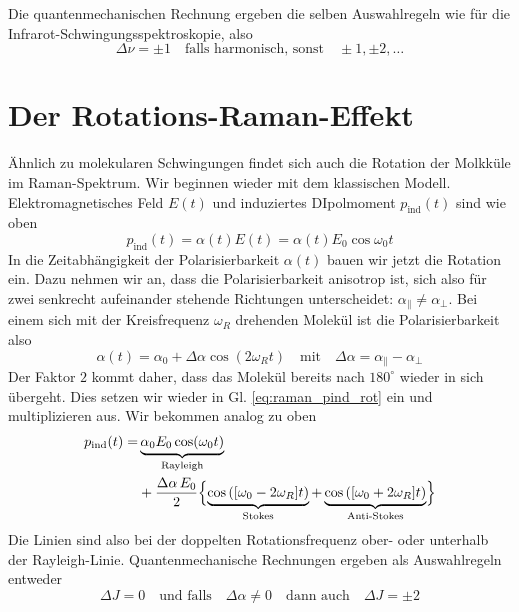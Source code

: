 Die quantenmechanischen Rechnung ergeben die selben Auswahlregeln wie für die Infrarot-Schwingungsspektroskopie, also 
\begin{equation}
 \Delta \nu = \pm 1 \quad \text{falls harmonisch, sonst} \quad \pm 1, \pm 2, \dots  
\end{equation}



\section{Der Rotations-Raman-Effekt}

Ähnlich zu molekularen Schwingungen findet sich auch die Rotation der Molkküle im Raman-Spektrum. Wir beginnen wieder mit dem klassischen Modell. Elektromagnetisches Feld $E(t)$ und induziertes DIpolmoment $p_\text{ind}(t)$ sind wie oben
\begin{equation}
p_\text{ind}(t) = \alpha(t) E(t) = \alpha(t) E_0 \cos \omega_0 t \label{eq:raman_pind_rot}
\end{equation}
In die Zeitabhängigkeit der Polarisierbarkeit $\alpha(t)$ bauen wir jetzt die Rotation ein. Dazu nehmen wir an, dass die Polarisierbarkeit anisotrop ist, sich also für zwei senkrecht aufeinander stehende Richtungen unterscheidet: $\alpha_\parallel \neq \alpha_\perp$. Bei einem sich mit der Kreisfrequenz $\omega_R$ drehenden Molekül ist die Polarisierbarkeit also
\begin{equation}
\alpha(t) = \alpha_0 + \Delta \alpha \cos ( 2 \omega_R t) \quad \text{mit} \quad \Delta \alpha = \alpha_\parallel - \alpha_\perp
\end{equation}
Der Faktor $2$ kommt daher, dass das Molekül bereits nach $180^\circ$ wieder in sich übergeht. Dies setzen wir wieder in Gl. \ref{eq:raman_pind_rot} ein und multiplizieren aus. Wir bekommen analog zu oben
\begin{align}
p_\text{ind}(t) = & \underbrace{  \alpha_0 E_0 \cos(\omega_0 t) }_\text{Rayleigh} \\
& +   \frac{ \Delta \alpha \,  E_0 }{2} 
\Bigl\{ 
\underbrace{ \cos \left( [\omega_0 -2 \omega_R] t \right)}_\text{Stokes}  +  \underbrace{\cos \left( [\omega_0 + 2 \omega_R] t \right)  
}_\text{Anti-Stokes} 
\Bigr\} 
\nonumber
\end{align}
Die Linien sind also bei der doppelten Rotationsfrequenz ober- oder unterhalb der Rayleigh-Linie. Quantenmechanische Rechnungen ergeben als Auswahlregeln entweder
\begin{equation}
\Delta J = 0 \quad \text{und falls} \quad  \Delta \alpha \neq 0 \quad  \text{dann auch} \quad \Delta J = \pm 2
\end{equation}
